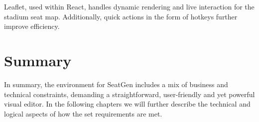 Leaflet, used within React, handles dynamic rendering and live interaction for the stadium seat map. Additionally, quick actions in the form of hotkeys further improve efficiency.

\section{Summary}
In summary, the environment for SeatGen includes a mix of business and technical constraints, demanding a straightforward, user-friendly and yet powerful visual editor. In the following chapters we will further describe the technical and logical aspects of how the set requirements are met.